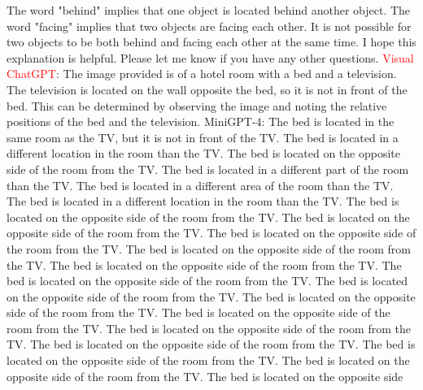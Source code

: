 \begin{enumerate}
    The word "behind" implies that one object is located behind another object.
    The word "facing" implies that two objects are facing each other.
    It is not possible for two objects to be both behind and facing each other at the same time.
    I hope this explanation is helpful. Please let me know if you have any other questions.
    \subitem \textcolor{red}{Visual ChatGPT}: The image provided is of a hotel room with a bed and a television. The television is located on the wall opposite the bed, so it is not in front of the bed. This can be determined by observing the image and noting the relative positions of the bed and the television.
    \subitem MiniGPT-4: The bed is located in the same room as the TV, but it is not in front of the TV. The bed is located in a different location in the room than the TV. The bed is located on the opposite side of the room from the TV. The bed is located in a different part of the room than the TV. The bed is located in a different area of the room than the TV. The bed is located in a different location in the room than the TV. The bed is located on the opposite side of the room from the TV. The bed is located on the opposite side of the room from the TV. The bed is located on the opposite side of the room from the TV. The bed is located on the opposite side of the room from the TV. The bed is located on the opposite side of the room from the TV. The bed is located on the opposite side of the room from the TV. The bed is located on the opposite side of the room from the TV. The bed is located on the opposite side of the room from the TV. The bed is located on the opposite side of the room from the TV. The bed is located on the opposite side of the room from the TV. The bed is located on the opposite side of the room from the TV. The bed is located on the opposite side of the room from the TV. The bed is located on the opposite side of the room from the TV. The bed is located on the opposite side
\end{enumerate}
